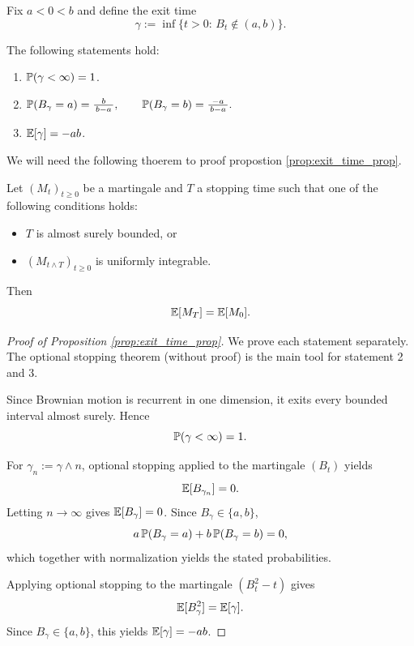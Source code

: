 Fix $a<0<b$ and define the exit time 
\[
\gamma := \inf\{t>0:\, B_t\notin(a,b)\}.
\]

\begin{proposition}
The following statements hold:
\begin{enumerate}
\label{prop:exit_time_prop}
\item $\mathbb{P}(\gamma<\infty)=1$.
\item $\mathbb{P}(B_\gamma=a)=\frac{b}{\,b-a\,},
\qquad
\mathbb{P}(B_\gamma=b)=\frac{-a}{\,b-a\,}.$
\item $\mathbb{E}[\gamma]=-ab$.
\end{enumerate}

\end{proposition}

We will need the following thoerem to proof propostion \ref{prop:exit_time_prop}.

\begin{theorem}
Let $(M_t)_{t\ge0}$ be a martingale and $T$ a stopping time such that one of the following
conditions holds:
\begin{itemize}
\item $T$ is almost surely bounded, or
\item $(M_{t\wedge T})_{t\ge0}$ is uniformly integrable.
\end{itemize}
Then
\[
\mathbb{E}[M_T]=\mathbb{E}[M_0].
\]
\end{theorem}

\begin{proof}[Proof of Proposition \ref{prop:exit_time_prop}]
We prove each statement separately. The optional stopping theorem (without proof) is the main tool for statement 2 and 3. 


Since Brownian motion is recurrent in one dimension, it exits every bounded interval almost surely. Hence
\[
\mathbb{P}(\gamma<\infty)=1.
\]

\medskip


For $\gamma_n:=\gamma\wedge n$, optional stopping applied to the martingale $(B_t)$ yields
\[
\mathbb{E}[B_{\gamma_n}]=0.
\]
Letting $n\to\infty$ gives $\mathbb{E}[B_\gamma]=0$. Since $B_\gamma\in\{a,b\}$,
\[
a\,\mathbb{P}(B_\gamma=a)+b\,\mathbb{P}(B_\gamma=b)=0,
\]
which together with normalization yields the stated probabilities.


Applying optional stopping to the martingale $(B_t^2-t)$ gives
\[
\mathbb{E}[B_\gamma^2]=\mathbb{E}[\gamma].
\]
Since $B_\gamma\in\{a,b\}$, this yields $\mathbb{E}[\gamma]=-ab$.
\end{proof}

